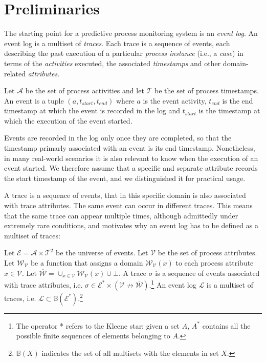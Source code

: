 \documentclass[manuscript,screen,review]{acmart}
\newcommand{\ML}{\mathcal{L}}
\begin{document}
\section{Preliminaries}\label{sec:prel}
The starting point for a predictive process monitoring system is an \textit{event log}. An event log is a multiset of \textit{traces}. Each trace is a sequence of events, each describing the past execution of a particular \textit{process instance} (i.e., a \textit{case}) in terms of the \textit{activities} executed, the associated \textit{timestamps} and other domain-related \textit{attributes}.

\begin{definition}[Events]
    Let $\mathcal{A}$ be the set of process activities and let $\mathcal{T}$ be the set of process timestamps. An event is a tuple $(a,t_{start},t_{end})$ where $a$ is the event activity, $t_{end}$ is the end timestamp at which the event is recorded in the log and $t_{start}$ is the timestamp at which the execution of the event started.
\end{definition}

\noindent

Events are recorded in the log only once they are completed, so that the timestamp primarly associated with an event is its end timestamp. Nonetheless, in many real-world scenarios it is also relevant to know when the execution of an event started. We therefore assume that a specific and separate attribute records the start timestamp of the event, and we distinguished it for practical usage.

A trace is a sequence of events, that in this specific domain is also associated with trace attributes. The same event can occur in different traces. This means that the same trace can appear multiple times, although admittedly under extremely rare conditions, and motivates why an event log has to be defined as a multiset of traces:

\begin{definition}\label{def:event_log}
Let $\mathcal{E}=\mathcal{A}\times\mathcal{T}^2$ be the universe of events. Let $\mathcal{V}$ be the set of process attributes. Let $\mathcal{W}_\mathcal{V}$ be a function that assigns a domain $\mathcal{W}_\mathcal{V}(x)$ to each process attribute $x\in\mathcal{V}$. Let $\overline{\mathcal{W}} = \cup_{x\in\mathcal{V}}\mathcal{W}_\mathcal{V}(x) \cup \bot$. A trace $\sigma$ is a sequence of events associated with trace attributes, i.e. $\sigma \in \mathcal{E}^{*}\times(\mathcal{V}\not\to\overline{\mathcal{W}})$.\footnote{The operator * refers to the Kleene star: given a set $A$, $A^*$ contains all the possible finite sequences of elements belonging to $A$.} An event log $\ML$ is a multiset of traces, i.e. $\ML \subset \mathbb{B}\left(\mathcal{E}^{*}\right)$.\footnote{$\mathbb{B}\left(X\right)$ indicates the set of all multisets with the elements in set $X$.}
\end{definition}
\end{document}
